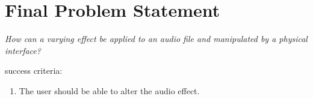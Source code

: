 \chapter{Final Problem Statement}\label{ch:finalproblem}

\textit{How can a varying effect be applied to an audio file and manipulated by a physical interface?}

success criteria:
\begin{enumerate}
\item The user should be able to alter the audio effect.
\end{enumerate}

